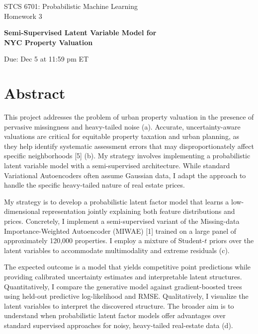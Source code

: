 \documentclass[11pt]{article}
\begin{document}
\begin{center}
{\Large STCS 6701: Probabilistic Machine Learning\\
Homework 3}

\vspace{0.5em}
{\LARGE \textbf{Semi-Supervised Latent Variable Model for\\ NYC Property Valuation}}

\vspace{1em}

Due: Dec 5 at 11:59 pm ET
\end{center}

\section*{Abstract}

This project addresses the problem of urban property valuation in the presence of pervasive missingness and heavy-tailed noise (a). Accurate, uncertainty-aware valuations are critical for equitable property taxation and urban planning, as they help identify systematic assessment errors that may disproportionately affect specific neighborhoods [5] (b). My strategy involves implementing a probabilistic latent variable model with a semi-supervised architecture. While standard Variational Autoencoders often assume Gaussian data, I adapt the approach to handle the specific heavy-tailed nature of real estate prices.

My strategy is to develop a probabilistic latent factor model that learns a low-dimensional representation jointly explaining both feature distributions and prices. Concretely, I implement a semi-supervised variant of the Missing-data Importance-Weighted Autoencoder (MIWAE) [1] trained on a large panel of approximately 120,000 properties. I employ a mixture of Student-$t$ priors over the latent variables to accommodate multimodality and extreme residuals (c).

The expected outcome is a model that yields competitive point predictions while providing calibrated uncertainty estimates and interpretable latent structures. Quantitatively, I compare the generative model against gradient-boosted trees using held-out predictive log-likelihood and RMSE. Qualitatively, I visualize the latent variables to interpret the discovered structure. The broader aim is to understand when probabilistic latent factor models offer advantages over standard supervised approaches for noisy, heavy-tailed real-estate data (d).
\end{document}
